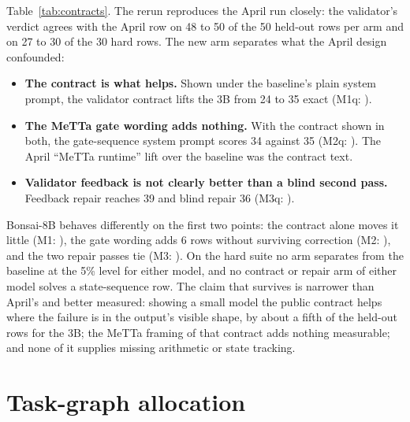 \documentclass[11pt]{article}
\begin{document}
\begin{table}[t]
  \centering
  \small
  \resizebox{\linewidth}{!}{}
  \caption{Exact successes on the output-contract suites, same rows across arms: the April Qwen2.5-3B run (blind repair was run only on the hard suite), this revision's CPU rerun of the April runner, and a second model, Bonsai-8B. Repair arms act only on rows the gate-wording arm got wrong.}
  \label{tab:contracts}
\end{table}

Table~\ref{tab:contracts}. The rerun reproduces the April run closely: the validator's verdict agrees with the April row on 48 to 50 of the 50 held-out rows per arm and on 27 to 30 of the 30 hard rows. The new arm separates what the April design confounded:
\begin{itemize}[leftmargin=*]
  \item \textbf{The contract is what helps.} Shown under the baseline's plain system prompt, the validator contract lifts the 3B from 24 to 35 exact (M1q: \testMoneq).
  \item \textbf{The MeTTa gate wording adds nothing.} With the contract shown in both, the gate-sequence system prompt scores 34 against 35 (M2q: \testMtwoq). The April ``MeTTa runtime'' lift over the baseline was the contract text.
  \item \textbf{Validator feedback is not clearly better than a blind second pass.} Feedback repair reaches 39 and blind repair 36 (M3q: \testMthreeq).
\end{itemize}
Bonsai-8B behaves differently on the first two points: the contract alone moves it little (M1: \testMone), the gate wording adds 6 rows without surviving correction (M2: \testMtwo), and the two repair passes tie (M3: \testMthree). On the hard suite no arm separates from the baseline at the 5\% level for either model, and no contract or repair arm of either model solves a state-sequence row. The claim that survives is narrower than April's and better measured: showing a small model the public contract helps where the failure is in the output's visible shape, by about a fifth of the held-out rows for the 3B; the MeTTa framing of that contract adds nothing measurable; and none of it supplies missing arithmetic or state tracking.

\section{Task-graph allocation}
\label{sec:allocation}
\end{document}
